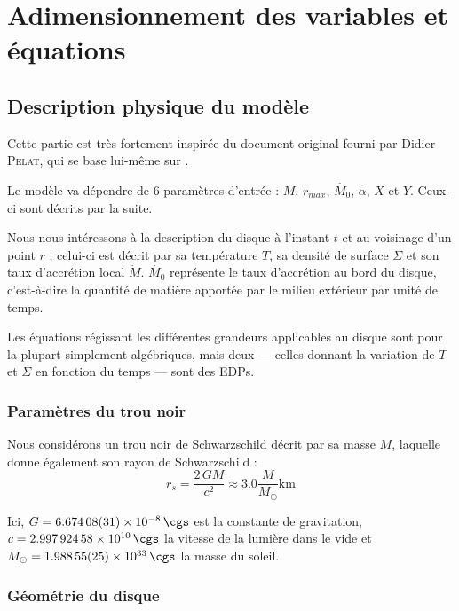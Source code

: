 \section{Adimensionnement des variables et équations}

\subsection{Description physique du modèle}

Cette partie est très fortement inspirée du document original fourni par Didier
\textsc{Pelat}, qui se base lui-même sur \citet{1984}.

Le modèle va dépendre de 6 paramètres d’entrée : $M$, $r_{max}$, $\dot{M_0}$,
$\alpha$, $X$ et $Y$. Ceux-ci sont décrits par la suite.

Nous nous intéressons à la description du disque à l’instant $t$ et au
voisinage d’un point $r$ ; celui-ci est décrit par sa température $T$, sa
densité de surface $\Sigma$ et son taux d’accrétion local $\dot{M}$.
$\dot{M_0}$ représente le taux d’accrétion au bord du disque, c’est-à-dire la
quantité de matière apportée par le milieu extérieur par unité de temps.

Les équations régissant les différentes grandeurs applicables au disque sont
pour la plupart simplement algébriques, mais deux — celles donnant la variation
de $T$ et $\Sigma$ en fonction du temps — sont des EDPs.

\subsubsection{Paramètres du trou noir}

Nous considérons un trou noir de Schwarzschild décrit par sa masse $M$,
laquelle donne également son rayon de Schwarzschild :
\begin{equation}
    \label{eq:rayon_schwarzschild}
    r_s = \frac{\num{2}\, G M}{c^2} \approx \num{3.0} \frac{M}{M_{\odot}} \si{\kilo\meter}
\end{equation}

Ici, $G = \SI{6.67408(31)d-8}{\cgs}$ est la
constante de gravitation, $c = \SI{2.99792458e10}{\cgs}$ la
vitesse de la lumière dans le vide et $M_{\odot} = \SI{1.98855(25)d33}{\cgs}$
la masse du soleil.

\subsubsection{Géométrie du disque}

